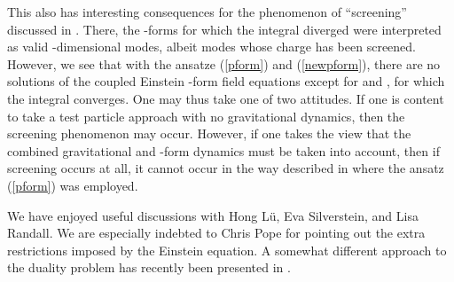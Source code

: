 \documentclass[a4paper,12pt]{article}
\begin{document}
This also has interesting consequences for the phenomenon of ``screening''
discussed in \cite{kaloper}. There, the \coordHE{}-forms for which the \coordHE{} integral
diverged were interpreted as valid \coordHE{}-dimensional modes, albeit modes whose
charge has been screened. However, we see that with the ansatze
(\ref{pform}) and (\ref{newpform}), there are no solutions of the coupled
Einstein \coordHE{}-form field equations except for \coordHE{} and \coordHE{}, for
which the
integral converges. One may thus take one of two attitudes. If one is
content to take a test particle approach with no gravitational
dynamics, then the screening phenomenon may occur.  However, if one
takes the view that the combined gravitational and \coordHE{}-form dynamics
must be taken into account, then if screening occurs at all, it cannot
occur in the way described in \cite{kaloper} where the ansatz
(\ref{pform}) was employed.



\bigskip

We have enjoyed useful discussions with Hong L\"u, Eva Silverstein, and
Lisa Randall. We are especially indebted to Chris Pope for pointing
out the extra restrictions imposed by the Einstein equation. A somewhat
different approach to the duality problem has recently been presented in
\cite{Silverstein}.

\bigskip
\end{document}
